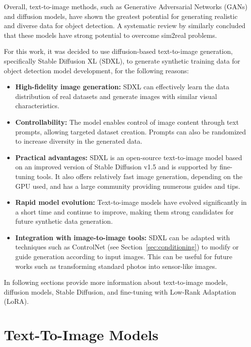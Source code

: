 Overall, text-to-image methods, such as Generative Adversarial Networks (GANs) and diffusion models, have shown the greatest potential for generating realistic and diverse data for object detection. A systematic review by \cite{Balance} similarly concluded that these models have strong potential to overcome sim2real problems.

For this work, it was decided to use diffusion-based text-to-image generation, specifically Stable Diffusion XL (SDXL), to generate synthetic training data for object detection model development, for the following reasons:

\begin{itemize}
\item \textbf{High-fidelity image generation:} SDXL can effectively learn the data distribution of real datasets and generate images with similar visual characteristics.
\item \textbf{Controllability:} The model enables control of image content through text prompts, allowing targeted dataset creation. Prompts can also be randomized to increase diversity in the generated data.
\item \textbf{Practical advantages:} SDXL is an open-source text-to-image model based on an improved version of Stable Diffusion v1.5 and is supported by fine-tuning tools. It also offers relatively fast image generation, depending on the GPU used, and has a large community providing numerous guides and tips.
\item \textbf{Rapid model evolution:} Text-to-image models have evolved significantly in a short time and continue to improve, making them strong candidates for future synthetic data generation.
\item \textbf{Integration with image-to-image tools:} SDXL can be adapted with techniques such as ControlNet (see Section~\ref{sec:conditioning}) to modify or guide generation according to input images. This can be useful for future works such as transforming standard photos into sensor-like images.
\end{itemize}

In following sections provide more information about text-to-image models, diffusion models, Stable Diffusion, and fine-tuning with Low-Rank Adaptation (LoRA).


\section{Text-To-Image Models}

